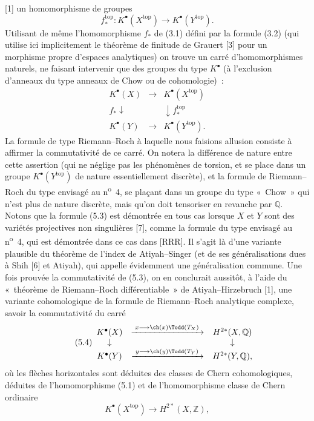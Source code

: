 [1] un
homomorphisme de groupes
\begin{equation}\tag{5.2}
f^{\mathrm{top}}_*:K^\bullet(X^{\mathrm{top}})\longrightarrow K^\bullet(Y^{\mathrm{top}}).
\end{equation}
Utilisant de m\^eme l'homomorphisme $f_*$ de (3.1) d\'efini par la formule (3.2) (qui utilise ici implicitement le th\'eor\`eme de finitude de Grauert [3] pour un morphisme propre d'espaces analytiques) on trouve un carr\'e d'homomorphismes naturels, ne faisant intervenir que des groupes du type $K^\bullet$ (\`a l'exclusion d'anneaux du type anneaux de Chow ou de cohomologie)~:
\begin{equation}\tag{5.3}
\begin{array}{ccc}
K^\bullet(X) & \longrightarrow & K^\bullet(X^{\mathrm{top}}) \\
f_*\downarrow && \downarrow f^{\mathrm{top}}_* \\
K^\bullet(Y) & \longrightarrow & K^\bullet(Y^{\mathrm{top}}).
\end{array}
\end{equation}
La formule de type Riemann--Roch \`a laquelle nous faisions allusion consiste \`a affirmer la commutativit\'e de ce carr\'e. On notera la diff\'erence de nature entre cette assertion (qui ne n\'eglige pas les ph\'enom\`enes de torsion, et se place dans un groupe $K^\bullet(Y^{\mathrm{top}})$ de nature essentiellement discr\`ete), et la formule de Riemann--Roch du type envisag\'e au n\textsuperscript{o}~4, se pla\c{c}ant dans un groupe du type «~Chow~» qui n'est plus de nature discr\`ete, mais qu'on doit tensoriser en revanche par $\mathbb Q$. Notons que la formule (5.3) est d\'emontr\'ee en tous cas lorsque $X$ et $Y$ sont des vari\'et\'es projectives non singuli\`eres [7], comme la formule du type envisag\'e au n\textsuperscript{o}~4, qui est d\'emontr\'ee dans ce cas dans [RRR]. Il s'agit l\`a d'une variante plausible du th\'eor\`eme de l'index de Atiyah--Singer (et de ses g\'en\'eralisations dues \`a Shih [6] et Atiyah), qui appelle \'evidemment une g\'en\'eralisation commune. Une fois prouv\'ee la commutativit\'e de (5.3), on en conclurait aussit\^ot, \`a l'aide du «~th\'eor\`eme de Riemann--Roch diff\'erentiable~» de Atiyah--Hirzebruch [1], une variante cohomologique de la formule de Riemann--Roch analytique complexe, savoir la commutativit\'e du carr\'e
\begin{equation}\tag{5.4}
\begin{array}{ccc}
K^\bullet(X) & \xrightarrow{\;x\longrightarrow \ch(x)\Todd(T_X)\;} & H^{2*}(X,\mathbb Q) \\
\downarrow && \downarrow \\
K^\bullet(Y) & \xrightarrow{\;y\longrightarrow \ch(y)\Todd(T_Y)\;} & H^{2*}(Y,\mathbb Q),
\end{array}
\end{equation}
o\`u les fl\`eches horizontales sont d\'eduites des classes de Chern cohomologiques, d\'eduites de l'homomorphisme (5.1) et de l'homomorphisme classe de Chern ordinaire
\[
K^\bullet(X^{\mathrm{top}})\longrightarrow H^{2*}(X,\mathbb Z),
\]
